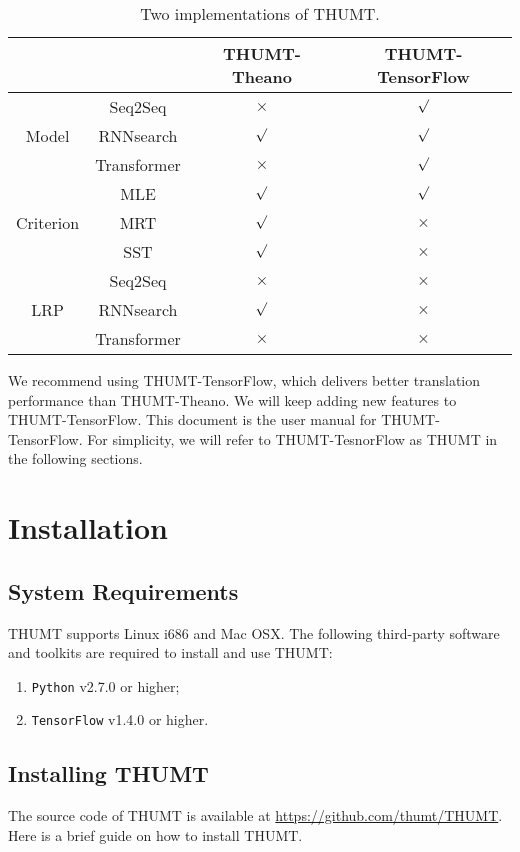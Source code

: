 \documentclass{article}
\begin{document}
\begin{table}[!t]
\centering
\begin{tabular}{|c|c|c|c|}
\cline{3-4}
\multicolumn{2}{c|}{} & THUMT-Theano & THUMT-TensorFlow \\
\hline
 & Seq2Seq &  $\times$ & $\surd$ \\
Model           & RNNsearch & $\surd$ & $\surd$ \\
           & Transformer & $\times$ & $\surd$ \\
\hline
 & MLE & $\surd$ & $\surd$ \\

Criterion               & MRT & $\surd$ & $\times$ \\
               & SST & $\surd$ & $\times$ \\
\hline
 & Seq2Seq & $\times$ & $\times$ \\
LRP        & RNNsearch & $\surd$ & $\times$ \\
        & Transformer & $\times$ & $\times$ \\
\hline
\end{tabular}
\caption{Two implementations of THUMT.} \label{table:1:implementation}
\end{table}

We recommend using THUMT-TensorFlow, which delivers better translation performance than THUMT-Theano. We will keep adding new features to THUMT-TensorFlow. This document is the user manual for THUMT-TensorFlow. For simplicity, we will refer to THUMT-TesnorFlow as THUMT in the following sections.


\section{Installation}

\subsection{System Requirements}
THUMT supports Linux i686 and Mac OSX. The following third-party software and toolkits are required to install and use THUMT:
\begin{enumerate}
\item \verb|Python| v2.7.0 or higher;
\item \verb|TensorFlow| v1.4.0 or higher.
\end{enumerate}

\subsection{Installing THUMT}
The source code of THUMT is available at \href{https://github.com/thumt/THUMT}{https://github.com/thumt/THUMT}. Here is a brief guide on how to install THUMT.
\end{document}
